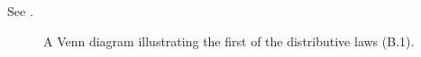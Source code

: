 See .
\begin{figure}[htb]
    
    \caption{A Venn diagram illustrating the first of the distributive laws (B.1).} \label{fig:B.1-1}
\end{figure}
